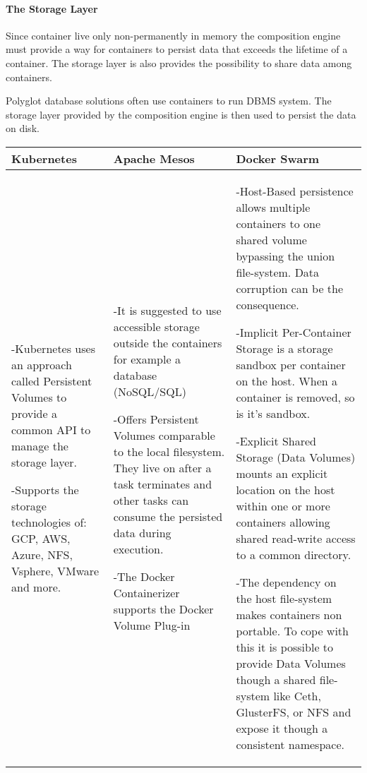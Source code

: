 \newpage
\paragraph{The Storage Layer}

Since container live only non-permanently in memory the composition engine must
provide a way for containers to persist data that exceeds the lifetime of a
container. The storage layer is also provides the possibility to share data
among containers.

Polyglot database solutions often use containers to run DBMS system. The storage
layer provided by the composition engine is then used to persist the data on
disk.

\begin{center}
  \begin{tabular}{ | p{4.5cm} | p{4.5cm} | p{4.5cm} | }
    \hline
    \textbf{Kubernetes}&\textbf{Apache Mesos}&\textbf{Docker Swarm}\\\hline
    -Kubernetes uses an approach called Persistent Volumes to provide a common
    API to manage the storage layer. 
    
    -Supports the storage technologies of: GCP, AWS, Azure, NFS, Vsphere,
    VMware and more.&

    -It is suggested to use accessible storage outside the containers for
    example a database (NoSQL/SQL)
    
    -Offers Persistent Volumes comparable to the local filesystem. They
    live on after a task terminates and other tasks can consume the persisted
    data during execution.
    
    -The Docker Containerizer supports the Docker Volume Plug-in & 
     
    -Host-Based persistence allows multiple containers to one shared volume
    bypassing the union file-system. Data corruption can be the consequence.
    
    -Implicit Per-Container Storage is a storage sandbox per container on
    the host. When a container is removed, so is it's sandbox.
    
    -Explicit Shared Storage (Data Volumes) mounts an explicit location on the
    host within one or more containers allowing shared read-write access to
    a common directory.
    
    -The dependency on the host file-system makes containers non portable. To
    cope with this it is possible to provide Data Volumes though a shared
    file-system like Ceth, GlusterFS, or NFS and expose it though a consistent
    namespace.\\
    \hline
  \end{tabular}
\end{center}


